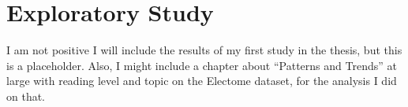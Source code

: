 \chapter{Exploratory Study}
I am not positive I will include the results of my first study in the thesis, but this is a placeholder. Also, I might include a chapter about ``Patterns and Trends'' at large with reading level and topic on the Electome dataset, for the analysis I did on that.








